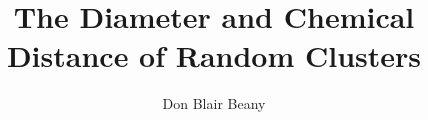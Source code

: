 \documentclass[aps, preprint, groupedaddress]{revtex4}
\begin{document}
\title{The Diameter and Chemical Distance of Random Clusters}

\author{Don Blair Beany}
\end{document}
